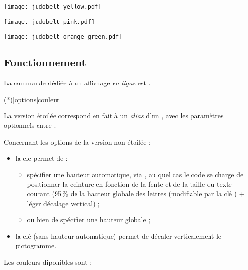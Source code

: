 \documentclass[french,11pt,a4paper]{article}
\begin{document}
\begin{demohigh}[language=latex/latex3,style/main=cyan!10,style/code=cyan!10,style/demo=cyan!10]
\texttt{[image: judobelt-yellow.pdf]}\par
\texttt{[image: judobelt-pink.pdf]}\par
\texttt{[image: judobelt-orange-green.pdf]}
\end{demohigh}

\subsection{Fonctionnement}

La commande dédiée à un affichage \textit{en ligne} est .

\begin{codehigh}[language=latex/latex2,style/main=cyan!10,style/code=cyan!10]
\CeintureCouleur(*)[options]{couleur}
\end{codehigh}

La version étoilée correspond en fait à un \textit{alias} d'un , avec les paramètres optionnels entre \MontreCode{[...]}.

\medskip

Concernant les options de la version non étoilée :

\begin{itemize}[leftmargin=*]
	\item la cle  permet de :
	\begin{itemize}
		\item spécifier une hauteur automatique, via , au quel cas le code se charge de positionner la ceinture en fonction de la fonte et de la taille du texte courant (95\,\% de la hauteur globale des lettres (modifiable par la clé ) + léger décalage vertical) ;
		\item ou bien de spécifier une hauteur globale ;
	\end{itemize}
	\item la clé  (sans hauteur automatique) permet de décaler verticalement le pictogramme.
\end{itemize}

Les couleurs diponibles sont :
\end{document}
